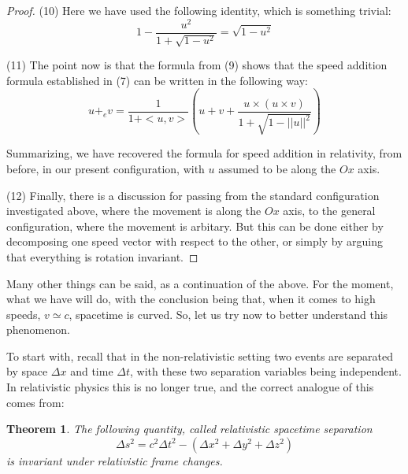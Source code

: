 \documentclass[12pt]{amsbook}
\newtheorem{theorem}{Theorem}[chapter]
\begin{document}
\begin{proof}
(10) Here we have used the following identity, which is something trivial:
$$1-\frac{u^2}{1+\sqrt{1-u^2}}=\sqrt{1-u^2}$$

(11) The point now is that the formula from (9) shows that the speed addition formula established in (7) can be written in the following way:
$$u+_ev=\frac{1}{1+<u,v>}\left(u+v+\frac{u\times(u\times v)}{1+\sqrt{1-||u||^2}}\right)$$

Summarizing, we have recovered the formula for speed addition in relativity, from before, in our present configuration, with $u$ assumed to be along the $Ox$ axis.

\medskip

(12) Finally, there is a discussion for passing from the standard configuration investigated above, where the movement is along the $Ox$ axis, to the general configuration, where the movement is arbitary. But this can be done either by decomposing one speed vector with respect to the other, or simply by arguing that everything is rotation invariant.
\end{proof}

Many other things can be said, as a continuation of the above. For the moment, what we have will do, with the conclusion being that, when it comes to high speeds, $v\simeq c$, spacetime is curved. So, let us try now to better understand this phenomenon.

\bigskip

To start with, recall that in the non-relativistic setting two events are separated by space $\Delta x$ and time $\Delta t$, with these two separation variables being independent. In relativistic physics this is no longer true, and the correct analogue of this comes from:


\begin{theorem}
The following quantity, called relativistic spacetime separation
$$\Delta s^2=c^2\Delta t^2-(\Delta x^2+\Delta y^2+\Delta z^2)$$
is invariant under relativistic frame changes.
\end{theorem}
\end{document}
